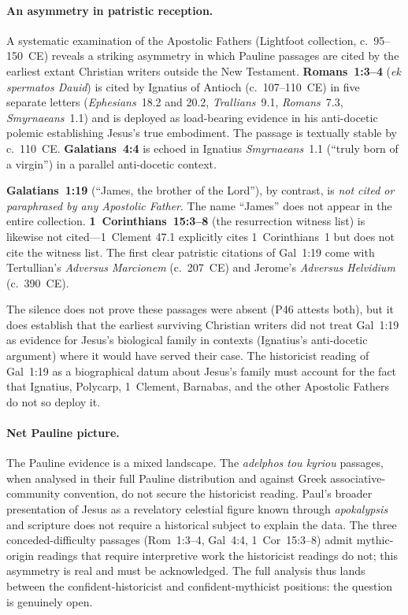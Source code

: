 \documentclass[12pt,oneside]{article}
\newcommand{\grk}[1]{\textit{#1}}
\begin{document}
\paragraph{An asymmetry in patristic reception.}
A systematic examination of the Apostolic Fathers
(Lightfoot collection, c.~95--150~CE) reveals a striking asymmetry
in which Pauline passages are cited by the earliest extant
Christian writers outside the New Testament.
\textbf{Romans~1:3--4} (\grk{ek spermatos Dauid}) is cited by
Ignatius of Antioch (c.~107--110~CE) in five separate letters
(\textit{Ephesians}~18.2 and 20.2, \textit{Trallians}~9.1,
\textit{Romans}~7.3, \textit{Smyrnaeans}~1.1) and is deployed as
load-bearing evidence in his anti-docetic polemic establishing
Jesus's true embodiment.  The passage is textually stable by
c.~110~CE.  \textbf{Galatians~4:4} is echoed in Ignatius
\textit{Smyrnaeans}~1.1 (\enquote{truly born of a virgin}) in a
parallel anti-docetic context.

\textbf{Galatians~1:19} (\enquote{James, the brother of the
Lord}), by contrast, is \textit{not cited or paraphrased by any
Apostolic Father}.  The name \enquote{James} does not appear in
the entire collection.  \textbf{1~Corinthians~15:3--8}
(the resurrection witness list) is likewise not cited---1~Clement
47.1 explicitly cites 1~Corinthians~1 but does not cite the
witness list.  The first clear patristic citations of Gal~1:19
come with Tertullian's \textit{Adversus Marcionem} (c.~207~CE)
and Jerome's \textit{Adversus Helvidium} (c.~390~CE).

The silence does not prove these passages were absent
(P46 attests both), but it does establish that the earliest
surviving Christian writers did not treat Gal~1:19 as evidence
for Jesus's biological family in contexts (Ignatius's anti-docetic
argument) where it would have served their case.  The
historicist reading of Gal~1:19 as a biographical datum about
Jesus's family must account for the fact that Ignatius, Polycarp,
1~Clement, Barnabas, and the other Apostolic Fathers do not so
deploy it.

\paragraph{Net Pauline picture.}
The Pauline evidence is a mixed landscape.  The \grk{adelphos tou
kyriou} passages, when analysed in their full Pauline distribution
and against Greek associative-community convention, do not secure
the historicist reading.  Paul's broader presentation of Jesus as
a revelatory celestial figure known through \grk{apokalypsis} and
scripture does not require a historical subject to explain the
data.  The three conceded-difficulty passages
(Rom~1:3--4, Gal~4:4, 1~Cor~15:3--8) admit mythic-origin readings
that require interpretive work the historicist readings do not;
this asymmetry is real and must be acknowledged.  The full
analysis thus lands between the confident-historicist and
confident-mythicist positions: the question is genuinely open.
\end{document}
